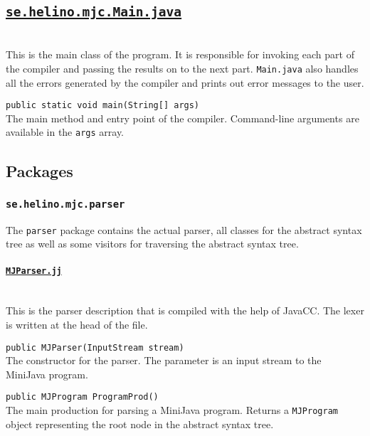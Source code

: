 \documentclass[11pt,oneside,a4paper]{article}
\newcommand{\code}[1]{\texttt{#1}}
\newcommand{\file}[1]{\texttt{#1}}
\newcommand{\class}[1]{\underline{\texttt{#1}}}
\begin{document}
\subsection{\class{se.helino.mjc.Main.java}} \hfill \\
This is the main class of the program. It is responsible for invoking each part
of the compiler and passing the results on to the next part. \file{Main.java} 
also handles all the errors generated by the compiler and prints out error
messages to the user.
\begin{description}
    \item{\code{public static void main(String[] args)}} \hfill \\
        The main method and entry point of the compiler. Command-line arguments
        are available in the \code{args} array.
\end{description}

\subsection{Packages}

\subsubsection{\code{se.helino.mjc.parser}}
The \code{parser} package contains the actual parser, all classes for the 
abstract syntax tree as well as some visitors for traversing the abstract 
syntax tree.

\paragraph{\class{MJParser.jj}} \hfill \\
This is the parser description that is compiled with the help of JavaCC. The
lexer is written at the head of the file.
\begin{description}
    \item{\code{public MJParser(InputStream stream)}} \hfill \\
        The constructor for the parser. The parameter is an input stream to the
        MiniJava program.

    \item{\code{public MJProgram ProgramProd()}} \hfill \\
        The main production for parsing a MiniJava program. Returns a
        \code{MJProgram}
        object representing the root node in the abstract syntax tree.
\end{description}
\end{document}
